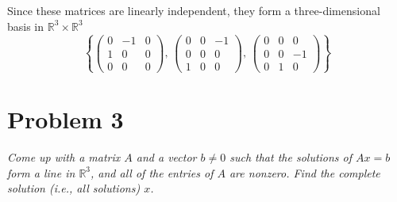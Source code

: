 \documentclass{article}
\begin{document}
Since these matrices are linearly independent, they form a three-dimensional
basis in $ \mathbb{R}^3 \times \mathbb{R}^3 $
$$ \left\{ \begin{pmatrix}
    0 & -1 & 0 \\
    1 & 0 & 0 \\
    0 & 0 & 0
\end{pmatrix},\, \begin{pmatrix}
    0 & 0 & -1 \\
    0 & 0 & 0 \\
    1 & 0 & 0
\end{pmatrix},\, \begin{pmatrix}
    0 & 0 & 0 \\
    0 & 0 & -1 \\
    0 & 1 & 0
\end{pmatrix} \right\} $$

\section*{Problem 3}

\textit{Come up with a matrix $A$ and a vector $b \ne 0$ such that the
solutions of $Ax=b$ form a line in $\mathbb{R}^3$, and all of the entries of
$A$ are nonzero. Find the complete solution (i.e., all solutions) $x$.}

\bigbreak
\end{document}
